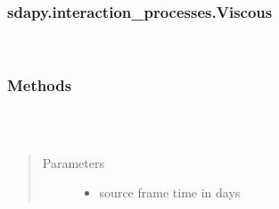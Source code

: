 \documentclass[letterpaper,10pt,english]{sphinxmanual}
\begin{document}
\subsubsection{sdapy.interaction\_processes.Viscous}
\label{\detokenize{generated/sdapy.interaction_processes.Viscous:sdapy-interaction-processes-viscous}}\label{\detokenize{generated/sdapy.interaction_processes.Viscous::doc}}

\begin{fulllineitems}
\label{\detokenize{generated/sdapy.interaction_processes.Viscous:sdapy.interaction_processes.Viscous}}~\subsubsection*{Methods}


\begin{savenotes}\sphinxattablestart
\centering
\begin{tabulary}{\linewidth}[t]{|T|T|}
\hline

&\\
\hline
\end{tabulary}
\par
\sphinxattableend\end{savenotes}

\begin{fulllineitems}
\label{\detokenize{generated/sdapy.interaction_processes.Viscous:sdapy.interaction_processes.Viscous.__init__}}~\begin{quote}\begin{description}
\item[{Parameters}] \leavevmode\begin{itemize}
\item {} 
 \textendash{} source frame time in days


\end{itemize}
\end{description}
\end{quote}
\end{fulllineitems}
\end{fulllineitems}
\end{document}
